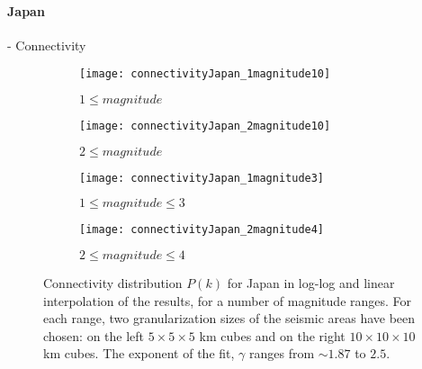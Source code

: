 \paragraph{Japan} - Connectivity
\begin{figure}[!h]
\begin{subfigure}{.99\textwidth}
  \centering
  \texttt{[image: connectivityJapan\_1magnitude10]}
  \caption{$1 \leq magnitude$}
  \label{fig:conJa1mag10}
\end{subfigure}%

\begin{subfigure}{.99\textwidth}
  \centering
  \texttt{[image: connectivityJapan\_2magnitude10]}
  \caption{$2\leq magnitude$}
  \label{fig:conJa2mag10}
\end{subfigure}%

\begin{subfigure}{.99\textwidth}
  \centering
  \texttt{[image: connectivityJapan\_1magnitude3]}
  \caption{$1 \leq magnitude \leq 3$}
  \label{fig:conJa1mag3}
\end{subfigure}%

\begin{subfigure}{.99\textwidth}
  \centering
  \texttt{[image: connectivityJapan\_2magnitude4]}
  \caption{$2 \leq magnitude \leq 4$}
  \label{fig:conJa2mag4}
\end{subfigure}%

\caption{Connectivity distribution $P(k)$ for Japan in log-log and linear interpolation of the results, for a number of magnitude ranges. For each range, two granularization sizes of the seismic areas have been chosen: on the left $5 \times 5 \times5 $ km cubes and on the right $10 \times 10 \times 10$ km cubes. The exponent of the fit, $\gamma$ ranges from $\sim 1.87$ to $2.5$.}
\label{fig:connectivityJa}
\end{figure}

\clearpage
